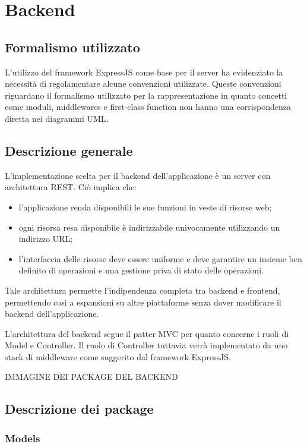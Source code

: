 \section{Backend}
\subsection{Formalismo utilizzato}
L'utilizzo del framework ExpressJS come base per il server ha evidenziato la necessità di regolamentare alcune convenzioni utilizzate. Queste convenzioni riguardano il formalismo utilizzato per la rappresentazione in quanto concetti come moduli, middlewares e first-class function non hanno una corrispondenza diretta nei diagrammi UML.


\subsection{Descrizione generale}
L'implementazione scelta per il backend dell'applicazione è un server con architettura REST. Ciò implica che:
\begin{itemize}
\item l'applicazione renda disponibili le sue funzioni in veste di risorse web;
\item ogni risorsa resa disponibile è indirizzabile univocamente utilizzando un indirizzo URL;
\item l'interfaccia delle risorse deve essere uniforme e deve garantire un insieme ben definito di operazioni e una gestione priva di stato delle operazioni.
\end{itemize}

Tale architettura permette l'indipendenza completa tra backend e frontend, permettendo così a espansioni su altre piattaforme senza dover modificare il backend dell'applicazione.

L'architettura del backend segue il patter MVC per quanto concerne i ruoli di Model e Controller. 
Il ruolo di Controller tuttavia verrà implementato da uno stack di middleware come suggerito dal framework ExpressJS.

IMMAGINE DEI PACKAGE DEL BACKEND

\subsection{Descrizione dei package}
\subsubsection{Models}
